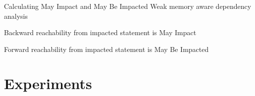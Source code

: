 \documentclass[t]{beamer}
\begin{document}
\begin{frame}{Calculating May Impact and May Be Impacted}
  Weak memory aware dependency analysis

  Backward reachability from impacted statement is May Impact

  Forward reachability from impacted statement is May Be Impacted
\end{frame}

\section{Experiments}





%
\end{document}

